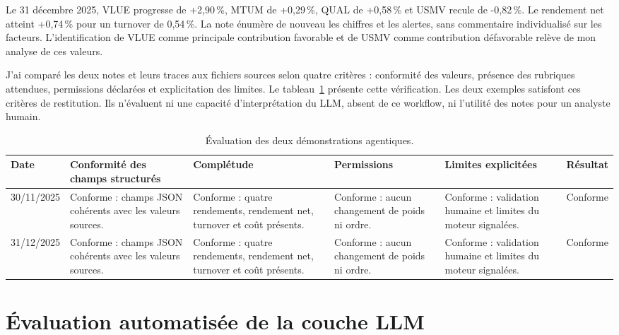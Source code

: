 Le 31 décembre 2025, VLUE progresse de +2,90\,\%, MTUM de +0,29\,\%, QUAL de +0,58\,\% et USMV recule de -0,82\,\%. Le rendement net atteint +0,74\,\% pour un turnover de 0,54\,\%. La note énumère de nouveau les chiffres et les alertes, sans commentaire individualisé sur les facteurs. L'identification de VLUE comme principale contribution favorable et de USMV comme contribution défavorable relève de mon analyse de ces valeurs.

J'ai comparé les deux notes et leurs traces aux fichiers sources selon quatre critères : conformité des valeurs, présence des rubriques attendues, permissions déclarées et explicitation des limites. Le tableau~\ref{tab:evaluation-agent} présente cette vérification. Les deux exemples satisfont ces critères de restitution. Ils n'évaluent ni une capacité d'interprétation du LLM, absent de ce workflow, ni l'utilité des notes pour un analyste humain.

\begin{table}[H]
\centering
\caption{Évaluation des deux démonstrations agentiques.}
\label{tab:evaluation-agent}
\scriptsize
\begin{adjustbox}{width=\textwidth}
\begin{tabular}{p{}p{}p{}p{}p{}p{}}
\toprule
\textbf{Date} & \textbf{Conformité des champs structurés} & \textbf{Complétude} & \textbf{Permissions} & \textbf{Limites explicitées} & \textbf{Résultat} \\
\midrule
30/11/2025 & Conforme : champs JSON cohérents avec les valeurs sources. & Conforme : quatre rendements, rendement net, turnover et coût présents. & Conforme : aucun changement de poids ni ordre. & Conforme : validation humaine et limites du moteur signalées. & Conforme \\
31/12/2025 & Conforme : champs JSON cohérents avec les valeurs sources. & Conforme : quatre rendements, rendement net, turnover et coût présents. & Conforme : aucun changement de poids ni ordre. & Conforme : validation humaine et limites du moteur signalées. & Conforme \\
\bottomrule
\end{tabular}
\end{adjustbox}
\end{table}



\section{Évaluation automatisée de la couche LLM}

